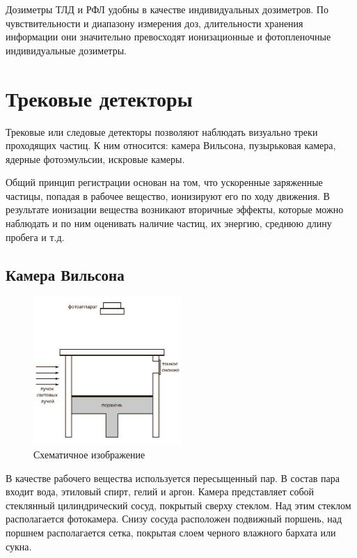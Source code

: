 \documentclass[14pt,pscyr,titlepage]{hedreport}
\begin{document}
		Дозиметры ТЛД и РФЛ удобны в качестве индивидуальных дозиметров. 
		По чувствительности и диапазону измерения доз, длительности хранения 
		информации они значительно превосходят ионизационные и фотопленочные 
		индивидуальные дозиметры. 

	\pagebreak
	\section{Трековые детекторы}
		Трековые или следовые детекторы позволяют наблюдать визуально треки 
		проходящих частиц. К ним относится: камера Вильсона, пузырьковая 
		камера, ядерные фотоэмульсии, искровые камеры.

		Общий принцип регистрации основан на том, что ускоренные заряженные 
		частицы, попадая в рабочее вещество, ионизируют его по ходу движения. 
		В результате ионизации вещества возникают вторичные эффекты, которые 
		можно наблюдать и по ним оценивать наличие частиц, их энергию, 
		среднюю длину пробега и т.д.

	\subsection{Камера Вильсона}
		\begin{figure}
			\vspace{-2ex}
			\includegraphics[width=0.5\textwidth]{wilson_cam}
			\parbox{0.5\textwidth}{\caption{Схематичное изображение}}
		\end{figure}
		В качестве рабочего вещества используется пересыщенный пар. В состав 
		пара входит вода, этиловый спирт, гелий и аргон. Камера представляет 
		собой стеклянный цилиндрический сосуд, покрытый сверху стеклом. Над 
		этим стеклом располагается фотокамера. Снизу сосуда 
		расположен подвижный поршень, над поршнем располагается сетка, 
		покрытая слоем черного влажного бархата или сукна.
\end{document}

